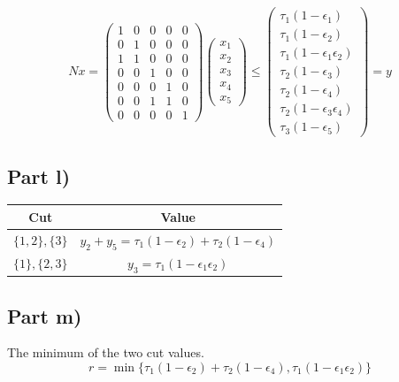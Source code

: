 \documentclass[10pt,a4paper]{article}
\begin{document}
\begin{equation*}
  Nx = \begin{pmatrix}
    1 & 0 & 0 & 0 & 0\\
    0 & 1 & 0 & 0 & 0\\
    1 & 1 & 0 & 0 & 0\\
    0 & 0 & 1 & 0 & 0\\
    0 & 0 & 0 & 1 & 0\\
    0 & 0 & 1 & 1 & 0\\
    0 & 0 & 0 & 0 & 1
  \end{pmatrix}
  \begin{pmatrix}
    x_{1}\\
    x_{2}\\
    x_{3}\\
    x_{4}\\
    x_{5}
  \end{pmatrix} \le \begin{pmatrix}
    \tau_{1} (1 - \epsilon_{1})\\
    \tau_{1} (1 - \epsilon_{2})\\
    \tau_{1} (1 - \epsilon_{1} \epsilon_{2})\\
    \tau_{2} (1 - \epsilon_{3})\\
    \tau_{2} (1 - \epsilon_{4})\\
    \tau_{2} (1 - \epsilon_{3} \epsilon_{4})\\
    \tau_{3} (1 - \epsilon_{5})
  \end{pmatrix} = y
\end{equation*}

\subsection*{Part l)}

\begin{tabular}{c|c}
  Cut & Value\\
  \hline
  $\{ 1, 2 \}, \{ 3 \}$ & $y_{2} + y_{5} = \tau_{1} (1 - \epsilon_{2}) + \tau_{2} (1 - \epsilon_{4})$\\
  $\{ 1 \}, \{ 2, 3 \}$ & $y_{3} = \tau_{1} (1 - \epsilon_{1} \epsilon_{2})$
\end{tabular}

\subsection*{Part m)}

The minimum of the two cut values.
\begin{equation*}
  r = \min \{ \tau_{1} (1 - \epsilon_{2}) + \tau_{2} (1 - \epsilon_{4}), \tau_{1} (1 - \epsilon_{1} \epsilon_{2}) \}
\end{equation*}
\end{document}
